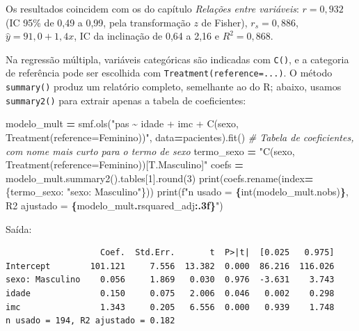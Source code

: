 \documentclass[
]{book}
\newenvironment{Shaded}{\begin{snugshade}}{\end{snugshade}}
\newcommand{\BuiltInTok}[1]{#1}
\newcommand{\CommentTok}[1]{\textcolor[rgb]{0.56,0.35,0.01}{\textit{#1}}}
\newcommand{\DecValTok}[1]{\textcolor[rgb]{0.00,0.00,0.81}{#1}}
\newcommand{\NormalTok}[1]{#1}
\newcommand{\OperatorTok}[1]{\textcolor[rgb]{0.81,0.36,0.00}{\textbf{#1}}}
\newcommand{\SpecialCharTok}[1]{\textcolor[rgb]{0.81,0.36,0.00}{\textbf{#1}}}
\newcommand{\SpecialStringTok}[1]{\textcolor[rgb]{0.31,0.60,0.02}{#1}}
\newcommand{\StringTok}[1]{\textcolor[rgb]{0.31,0.60,0.02}{#1}}
\begin{document}
Os resultados coincidem com os do capítulo \emph{Relações entre variáveis}: \(r = 0{,}932\) (IC 95\% de 0,49 a 0,99, pela transformação \(z\) de Fisher), \(r_s = 0{,}886\), \(\hat{y} = 91{,}0 + 1{,}4x\), IC da inclinação de 0,64 a 2,16 e \(R^2 = 0{,}868\).

Na regressão múltipla, variáveis categóricas são indicadas com \texttt{C()}, e a categoria de referência pode ser escolhida com \texttt{Treatment(reference=...)}. O método \texttt{summary()} produz um relatório completo, semelhante ao do R; abaixo, usamos \texttt{summary2()} para extrair apenas a tabela de coeficientes:

\begin{Shaded}
\begin{Highlighting}[]
\NormalTok{modelo\_mult }\OperatorTok{=}\NormalTok{ smf.ols(}\StringTok{"pas \textasciitilde{} idade + imc + C(sexo, Treatment(reference=\textquotesingle{}Feminino\textquotesingle{}))"}\NormalTok{,}
\NormalTok{                      data}\OperatorTok{=}\NormalTok{pacientes).fit()}
\CommentTok{\# Tabela de coeficientes, com nome mais curto para o termo de sexo}
\NormalTok{termo\_sexo }\OperatorTok{=} \StringTok{"C(sexo, Treatment(reference=\textquotesingle{}Feminino\textquotesingle{}))[T.Masculino]"}
\NormalTok{coefs }\OperatorTok{=}\NormalTok{ modelo\_mult.summary2().tables[}\DecValTok{1}\NormalTok{].}\BuiltInTok{round}\NormalTok{(}\DecValTok{3}\NormalTok{)}
\BuiltInTok{print}\NormalTok{(coefs.rename(index}\OperatorTok{=}\NormalTok{\{termo\_sexo: }\StringTok{"sexo: Masculino"}\NormalTok{\}))}
\BuiltInTok{print}\NormalTok{(}\SpecialStringTok{f"n usado = }\SpecialCharTok{\{}\BuiltInTok{int}\NormalTok{(modelo\_mult.nobs)}\SpecialCharTok{\}}\SpecialStringTok{, R2 ajustado = }\SpecialCharTok{\{}\NormalTok{modelo\_mult}\SpecialCharTok{.}\NormalTok{rsquared\_adj}\SpecialCharTok{:.3f\}}\SpecialStringTok{"}\NormalTok{)}
\end{Highlighting}
\end{Shaded}

Saída:

\begin{verbatim}
                   Coef.  Std.Err.       t  P>|t|  [0.025   0.975]
Intercept        101.121     7.556  13.382  0.000  86.216  116.026
sexo: Masculino    0.056     1.869   0.030  0.976  -3.631    3.743
idade              0.150     0.075   2.006  0.046   0.002    0.298
imc                1.343     0.205   6.556  0.000   0.939    1.748
n usado = 194, R2 ajustado = 0.182
\end{verbatim}
\end{document}
